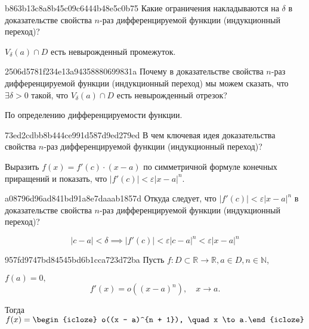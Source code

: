 \begin{note}{b863b13c8a8b45c09c6444b48e5c0b75}
    Какие ограничения накладываются на \( \delta \) в доказательстве свойства \( n \)-раз дифференцируемой функции (индукционный переход)?

    \begin{cloze}{1}
        \( V_{\delta} (a) \cap D \) есть невырожденный промежуток.
    \end{cloze}
\end{note}

\begin{note}{2506d5781f234e13a94358880699831a}
    Почему в доказательстве свойства \( n \)-раз дифференцируемой функции (индукционный переход) мы можем сказать, что
    \( \exists \delta > 0 \) такой,  что \( V_{\delta} (a) \cap D \) есть невырожденный отрезок?

    \begin{cloze}{1}
        По определению дифференцируемости функции.
    \end{cloze}
\end{note}

\begin{note}{73ed2cdbb8b444ce991d587d9ed279ed}
    В чем ключевая идея доказательства свойства \( n \)-раз дифференцируемой функции (индукционный переход)?

    \begin{cloze}{1}
        Выразить \( f(x) = f'(c) \cdot (x - a) \) по симметричной формуле конечных приращений и показать, что \( |f'(c)| < \varepsilon |x - a|^{n} \).
    \end{cloze}
\end{note}

\begin{note}{a08796d96ad841bd91a8e7daaab1857d}
    Откуда следует, что \( |f'(c)| < \varepsilon|x - a|^{n}  \) в доказательстве свойства \( n \)-раз дифференцируемой функции (индукционный переход)?

    \begin{cloze}{1}
        \[
            |c - a| < \delta \implies |f'(c)| < \varepsilon|c - a|^{n} < \varepsilon|x - a|^{n}
        \]
    \end{cloze}
\end{note}

\begin{note}{957fd9747bd84545bd6b1cca723d72ba}
    Пусть \( f : D \subset \mathbb R \to \mathbb R, a \in D, n \in \mathbb N \), \begin{icloze}{2}\(f(a) = 0, \)
    \[
        f'(x) = o((x - a)^{n} ), \quad x \to a.
    \]\end{icloze}

    Тогда \( f(x) = \begin{icloze}{1}o((x - a)^{n + 1}), \quad x \to a.\end{icloze} \)
\end{note}

